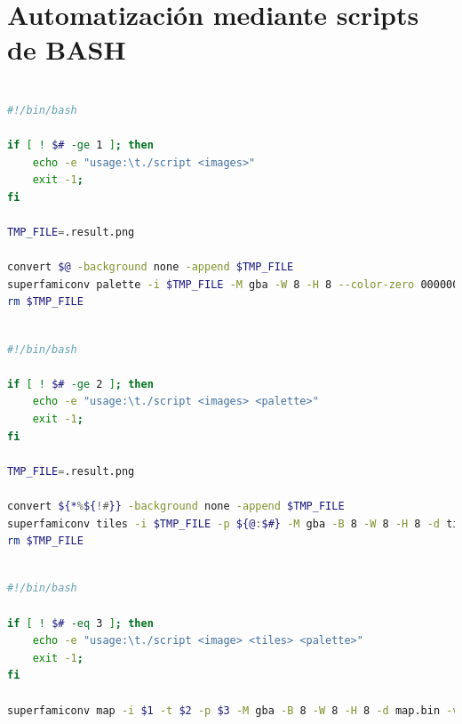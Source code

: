 \section{Automatización mediante scripts de BASH}\label{ap:scripts}

\begin{lstlisting}[language=bash,breaklines=true,caption={Script (palettegen.sh) encargado de generar la paleta de colores para todas las imágenes proporcionadas.},label={lst:ap_palette}]

#!/bin/bash

if [ ! $# -ge 1 ]; then
	echo -e "usage:\t./script <images>"
	exit -1;
fi

TMP_FILE=.result.png

convert $@ -background none -append $TMP_FILE
superfamiconv palette -i $TMP_FILE -M gba -W 8 -H 8 --color-zero 000000 -d palette.bin -v
rm $TMP_FILE

\end{lstlisting}
\vspace{1cm}

\begin{lstlisting}[language=bash,breaklines=true,caption={Script (tilesgen.sh) encargado de generar un \textit{tileset} a partir de cada grupo de imágenes proporcionado. También hay que incluir la paleta generada anteriormente.},label={lst:ap_tiles}]

#!/bin/bash

if [ ! $# -ge 2 ]; then
	echo -e "usage:\t./script <images> <palette>"
	exit -1;
fi

TMP_FILE=.result.png

convert ${*%${!#}} -background none -append $TMP_FILE
superfamiconv tiles -i $TMP_FILE -p ${@:$#} -M gba -B 8 -W 8 -H 8 -d tiles.bin -v
rm $TMP_FILE

\end{lstlisting}
\vspace{1cm}

\begin{lstlisting}[language=bash,breaklines=true,caption={Script (mapgen.sh) encargado de generar un mapa a partir de un \textit{tileset}, paleta e imagen.},label={lst:ap_map}]

#!/bin/bash

if [ ! $# -eq 3 ]; then
	echo -e "usage:\t./script <image> <tiles> <palette>"
	exit -1;
fi

superfamiconv map -i $1 -t $2 -p $3 -M gba -B 8 -W 8 -H 8 -d map.bin -v

\end{lstlisting}
\newpage

